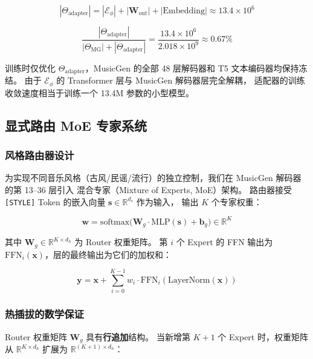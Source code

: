\begin{equation}
|\Theta_{\text{adapter}}| = |\mathcal{E}_{\phi}| + |\mathbf{W}_{\text{out}}| + |\text{Embedding}|
\approx 13.4\times 10^6
\end{equation}

\begin{equation}
\frac{|\Theta_{\text{adapter}}|}{|\Theta_{\text{MG}}| + |\Theta_{\text{adapter}}|}
= \frac{13.4\times 10^6}{2.018\times 10^9} \approx 0.67\%
\end{equation}

训练时仅优化 $\Theta_{\text{adapter}}$，MusicGen 的全部 48 层解码器和 T5 文本编码器均保持冻结。
由于 $\mathcal{E}_{\phi}$ 的 Transformer 层与 MusicGen 解码器层完全解耦，
适配器的训练收敛速度相当于训练一个 13.4M 参数的小型模型。

\subsection{显式路由 MoE 专家系统}

\subsubsection{风格路由器设计}

为实现不同音乐风格（古风/民谣/流行）的独立控制，我们在 MusicGen 解码器的第 13--36 层引入
混合专家（Mixture of Experts, MoE）架构。
路由器接受 \texttt{[STYLE]} Token 的嵌入向量 $\mathbf{s} \in \mathbb{R}^{d_s}$ 作为输入，
输出 $K$ 个专家权重：

\begin{equation}
\mathbf{w} = \text{softmax}\big(\mathbf{W}_g \cdot \text{MLP}(\mathbf{s}) + \mathbf{b}_g\big) \in \mathbb{R}^{K}
\end{equation}

其中 $\mathbf{W}_g \in \mathbb{R}^{K \times d_h}$ 为 Router 权重矩阵。
第 $i$ 个 Expert 的 FFN 输出为 $\text{FFN}_i(\mathbf{x})$，层的最终输出为它们的加权和：

\begin{equation}
\mathbf{y} = \mathbf{x} + \sum_{i=0}^{K-1} w_i \cdot \text{FFN}_i(\text{LayerNorm}(\mathbf{x}))
\end{equation}

\subsubsection{热插拔的数学保证}

Router 权重矩阵 $\mathbf{W}_g$ 具有\textbf{行追加}结构。
当新增第 $K+1$ 个 Expert 时，权重矩阵从 $\mathbb{R}^{K \times d_h}$ 扩展为 $\mathbb{R}^{(K+1) \times d_h}$：

